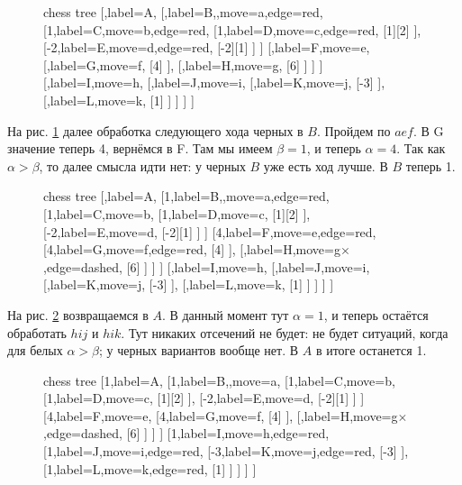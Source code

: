 {\begin{figure}[h]
		\begin{forest}chess tree
			[,label=A,
			[,label=B,,move=a,edge=red,
			[{1},label={C},move=b,edge=red,
			[1,label=D,move=c,edge=red,
			[1][2]
			],
			[-2,label=E,move=d,edge=red,
			[-2][1]
			]
			]
			[,label=F,move=e,
			[,label=G,move=f,
			[4]
			],
			[,label=H,move=g,
			[6]
			]
			]
			]
			[,label=I,move=h,
			[,label=J,move=i,
			[,label=K,move=j,
			[-3]
			],
			[,label=L,move=k,
			[1]
			]
			]	
			]
			]
		\end{forest}
	\end{figure}
	
	На рис. \ref{fig: tree3} далее обработка следующего хода черных в $B$. Пройдем по $aef$. В G значение теперь 4, вернёмся в F. Там мы имеем $\beta=1$, и теперь $\alpha=4$. Так как $\alpha>\beta$, то далее смысла идти нет: у черных $B$ уже есть ход лучше. В $B$ теперь 1.
	
	\begin{figure}[t]
		\centering
		\caption{}
		\label{fig: tree3}
		
		\begin{forest}chess tree
			[,label=A,
			[1,label=B,,move=a,edge=red,
			[{1},label={C},move=b,
			[1,label=D,move=c,
			[1][2]
			],
			[-2,label=E,move=d,
			[-2][1]
			]
			]
			[4,label=F,move=e,edge=red,
			[4,label=G,move=f,edge=red,
			[4]
			],
			[,label=H,move={g$\times$},edge=dashed,
			[6]
			]
			]
			]
			[,label=I,move=h,
			[,label=J,move=i,
			[,label=K,move=j,
			[-3]
			],
			[,label=L,move=k,
			[1]
			]
			]	
			]
			]
		\end{forest}
	\end{figure}

	На рис. \ref{fig: tree4} возвращаемся в $A$. В данный момент тут $\alpha=1$, и теперь остаётся обработать $hij$ и $hik$. Тут никаких отсечений не будет: не будет ситуаций, когда для белых $\alpha>\beta$; у черных вариантов вообще нет. В $A$ в итоге останется 1.
	
	\begin{figure}[t]
		\centering
		\caption{}
		\label{fig: tree4}
		
		\begin{forest}chess tree
			[1,label=A,
			[1,label=B,,move=a,
			[{1},label={C},move=b,
			[1,label=D,move=c,
			[1][2]
			],
			[-2,label=E,move=d,
			[-2][1]
			]
			]
			[4,label=F,move=e,
			[4,label=G,move=f,
			[4]
			],
			[,label=H,move={g$\times$},edge=dashed,
			[6]
			]
			]
			]
			[1,label=I,move=h,edge=red,
			[1,label=J,move=i,edge=red,
			[-3,label=K,move=j,edge=red,
			[-3]
			],
			[1,label=L,move=k,edge=red,
			[1]
			]
			]	
			]
			]
		\end{forest}
	\end{figure}
}